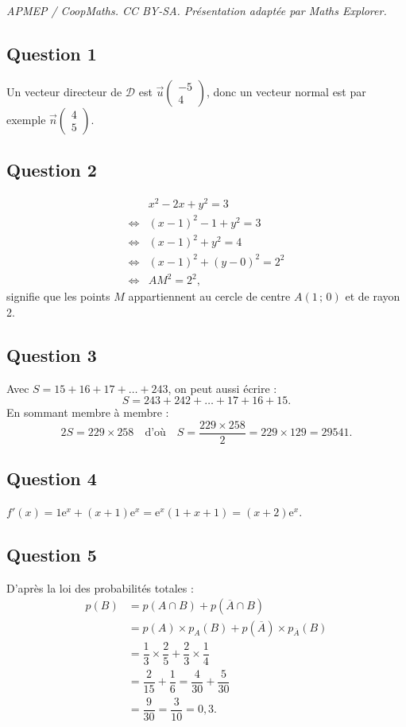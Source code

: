 \documentclass[10pt]{article}
\providecommand{\e}{{\mathrm{e}}}
\begin{document}
\noindent\textit{APMEP / CoopMaths. CC BY-SA. Présentation adaptée par Maths Explorer.}\par\medskip
\subsection*{Question 1}

Un vecteur directeur de \(\mathcal{D}\) est \(\vec{u} \begin{pmatrix} -5 \\ 4 \end{pmatrix}\), donc un vecteur normal est par exemple \(\vec{n} \begin{pmatrix} 4 \\ 5 \end{pmatrix}\).

\subsection*{Question 2}

\begin{align*}
&x^2 - 2x + y^2 = 3 \\
\iff &(x - 1)^2 - 1 + y^2 = 3 \\
\iff &(x - 1)^2 + y^2 = 4 \\
\iff &(x - 1)^2 + (y - 0)^2 = 2^2 \\
\iff &AM^2 = 2^2,
\end{align*}
signifie que les points \(M\) appartiennent au cercle de centre \(A(1\,;\,0)\) et de rayon 2.

\subsection*{Question 3}

Avec \(S = 15 + 16 + 17 + \dots + 243\), on peut aussi écrire :
\[
S = 243 + 242 + \dots + 17 + 16 + 15.
\]
En sommant membre à membre :
\[
2S = 229 \times 258 \quad \text{d'où} \quad S = \dfrac{229 \times 258}{2} = 229 \times 129 = 29541.
\]

\subsection*{Question 4}

\(f'(x) = 1\e^x + (x + 1) \e^x = \e^x(1 + x + 1) = (x + 2) \e^x\).

\subsection*{Question 5}

D'après la loi des probabilités totales :
\begin{align*}
p(B) &= p(A \cap B) + p(\overline{A} \cap B) \\
&= p(A) \times p_A(B) + p(\overline{A}) \times p_{\overline{A}}(B) \\
&= \dfrac{1}{3} \times \dfrac{2}{5} + \dfrac{2}{3} \times \dfrac{1}{4} \\
&= \dfrac{2}{15} + \dfrac{1}{6} = \dfrac{4}{30} + \dfrac{5}{30} \\
&= \dfrac{9}{30} = \dfrac{3}{10} = 0{,}3.
\end{align*}
\end{document}
